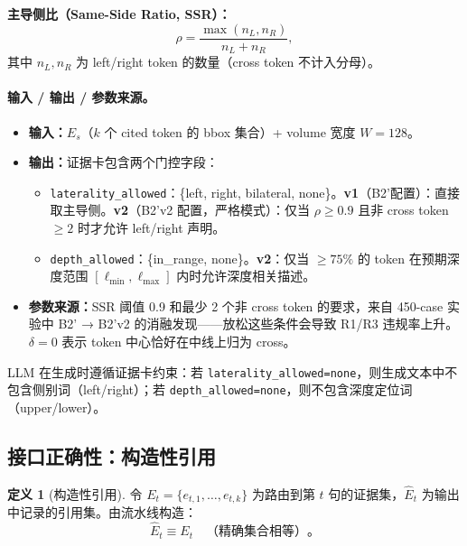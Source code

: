 \documentclass[11pt,a4paper]{article}
\theoremstyle{definition}
\newtheorem{definition}{定义}[section]
\begin{document}
\textbf{主导侧比（Same-Side Ratio, SSR）：}
\begin{equation}
\rho = \frac{\max(n_L, n_R)}{n_L + n_R},
\end{equation}
其中 $n_L, n_R$ 为 left/right token 的数量（cross token 不计入分母）。

\paragraph{输入 / 输出 / 参数来源。}
\begin{itemize}[nosep]
    \item \textbf{输入：}$E_s$（$k$ 个 cited token 的 bbox 集合）+ volume 宽度 $W = 128$。
    \item \textbf{输出：}证据卡包含两个门控字段：
    \begin{itemize}[nosep]
        \item \texttt{laterality\_allowed}：\{left, right, bilateral, none\}。\textbf{v1}（B2'配置）：直接取主导侧。\textbf{v2}（B2'v2 配置，严格模式）：仅当 $\rho \geq 0.9$ 且非 cross token $\geq 2$ 时才允许 left/right 声明。
        \item \texttt{depth\_allowed}：\{in\_range, none\}。\textbf{v2}：仅当 $\geq 75\%$ 的 token 在预期深度范围 $[\ell_{\min}, \ell_{\max}]$ 内时允许深度相关描述。
    \end{itemize}
    \item \textbf{参数来源：}SSR 阈值 0.9 和最少 2 个非 cross token 的要求，来自 450-case 实验中 B2' → B2'v2 的消融发现——放松这些条件会导致 R1/R3 违规率上升。$\delta = 0$ 表示 token 中心恰好在中线上归为 cross。
\end{itemize}

LLM 在生成时遵循证据卡约束：若 \texttt{laterality\_allowed=none}，则生成文本中不包含侧别词（left/right）；若 \texttt{depth\_allowed=none}，则不包含深度定位词（upper/lower）。

\subsection{接口正确性：构造性引用}

\begin{definition}[构造性引用]
令 $E_t = \{e_{t,1},\ldots,e_{t,k}\}$ 为路由到第 $t$ 句的证据集，$\hat{E}_t$ 为输出中记录的引用集。由流水线构造：
\begin{equation}\label{eq:cite}
\hat{E}_t \equiv E_t \quad \text{（精确集合相等）}。
\end{equation}
\end{definition}
\end{document}
